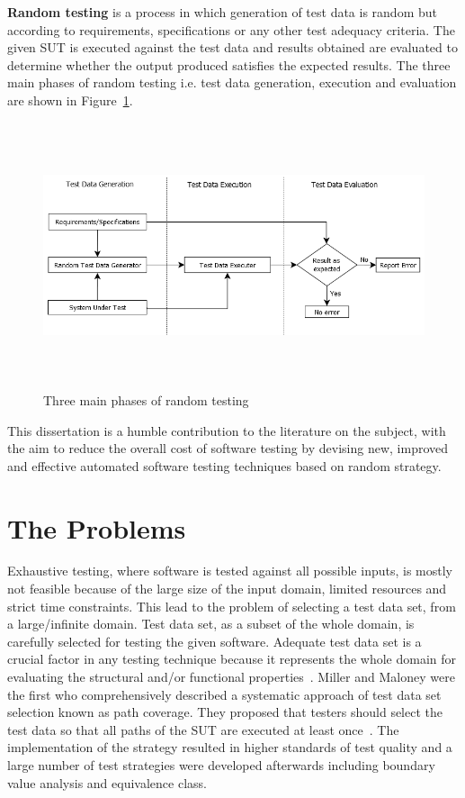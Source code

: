 {\textbf {Random testing}} is a process in which generation of test data is random but according to requirements, specifications or any other test adequacy criteria. The given SUT is executed against the test data and results obtained are evaluated to determine whether the output produced satisfies the expected results. The three main phases of random testing i.e. test data generation, execution and evaluation are shown in Figure~\ref{fig:SoftwareTesting1}.
\\
\begin{figure}[h]
	\centering
		\includegraphics[width=15.3cm, height=7.8cm ]{chapter1/SoftwareTesting1.png}
		\caption{Three main phases of random testing}
	\label{fig:SoftwareTesting1}
\end{figure}

This dissertation is a humble contribution to the literature on the subject, with the aim to reduce the overall cost of software testing by devising new, improved and effective automated software testing techniques based on random strategy.

\section{The Problems}
Exhaustive testing, where software is tested against all possible inputs, is mostly not feasible because of the large size of the input domain, limited resources and strict time constraints. This lead to the problem of selecting a test data set, from a large/infinite domain. Test data set, as a subset of the whole domain, is carefully selected for testing the given software. Adequate test data set is a crucial factor in any testing technique because it represents the whole domain for evaluating the structural and/or functional properties~\cite{howden1986, mccabe1983}. Miller and Maloney were the first who comprehensively described a systematic approach of test data set selection known as path coverage. They proposed that testers should select the test data so that all paths of the SUT are executed at least once~\cite{Miller1963}. The implementation of the strategy resulted in higher standards of test quality and a large number of test strategies were developed afterwards including boundary value analysis and equivalence class.

